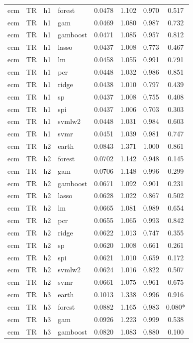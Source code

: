 \begin{ThreePartTable}
\begin{longtable}[t]{llclcccc}
ecm & TR & h1 & forest & 0.0478 & 1.102 & 0.970 & 0.517\\
ecm & TR & h1 & gam & 0.0469 & 1.080 & 0.987 & 0.732\\
ecm & TR & h1 & gamboost & 0.0471 & 1.085 & 0.957 & 0.812\\
ecm & TR & h1 & lasso & 0.0437 & 1.008 & 0.773 & 0.467\\
ecm & TR & h1 & lm & 0.0458 & 1.055 & 0.991 & 0.791\\
ecm & TR & h1 & pcr & 0.0448 & 1.032 & 0.986 & 0.851\\
ecm & TR & h1 & ridge & 0.0438 & 1.010 & 0.797 & 0.439\\
ecm & TR & h1 & sp & 0.0437 & 1.008 & 0.755 & 0.408\\
ecm & TR & h1 & spi & 0.0437 & 1.006 & 0.703 & 0.303\\
ecm & TR & h1 & svmlw2 & 0.0448 & 1.031 & 0.984 & 0.603\\
ecm & TR & h1 & svmr & 0.0451 & 1.039 & 0.981 & 0.747\\
\addlinespace
ecm & TR & h2 & earth & 0.0843 & 1.371 & 1.000 & 0.861\\
ecm & TR & h2 & forest & 0.0702 & 1.142 & 0.948 & 0.145\\
ecm & TR & h2 & gam & 0.0706 & 1.148 & 0.996 & 0.299\\
ecm & TR & h2 & gamboost & 0.0671 & 1.092 & 0.901 & 0.231\\
ecm & TR & h2 & lasso & 0.0628 & 1.022 & 0.867 & 0.502\\
ecm & TR & h2 & lm & 0.0665 & 1.081 & 0.989 & 0.654\\
ecm & TR & h2 & pcr & 0.0655 & 1.065 & 0.993 & 0.842\\
ecm & TR & h2 & ridge & 0.0622 & 1.013 & 0.747 & 0.355\\
ecm & TR & h2 & sp & 0.0620 & 1.008 & 0.661 & 0.261\\
ecm & TR & h2 & spi & 0.0621 & 1.010 & 0.659 & 0.172\\
ecm & TR & h2 & svmlw2 & 0.0624 & 1.016 & 0.822 & 0.507\\
ecm & TR & h2 & svmr & 0.0661 & 1.075 & 0.961 & 0.675\\
\addlinespace
ecm & TR & h3 & earth & 0.1013 & 1.338 & 0.996 & 0.916\\
ecm & TR & h3 & forest & 0.0882 & 1.165 & 0.983 & 0.080*\\
ecm & TR & h3 & gam & 0.0926 & 1.223 & 0.999 & 0.538\\
ecm & TR & h3 & gamboost & 0.0820 & 1.083 & 0.880 & 0.100\\

\end{longtable}
\end{ThreePartTable}
